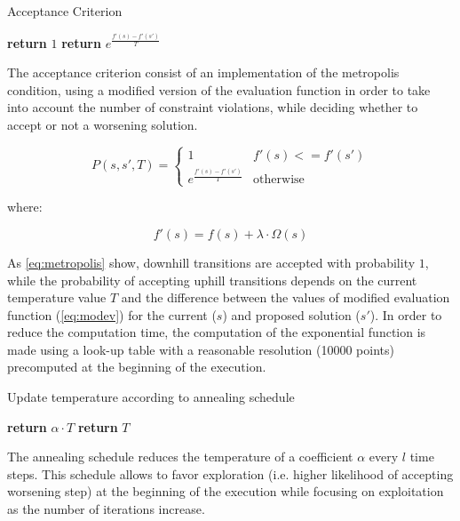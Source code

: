 \begin{homeworkProblem}
\begin{algorithm}
\caption{Acceptance Criterion}
\label{saTSPTW}
\begin{algorithmic}
  \State \textbf{return} $1$
\Else
  \State \textbf{return} $e^{\frac{f'(s)-f'(s')}{T}}$
\EndIf
\EndProcedure
\end{algorithmic}
\end{algorithm}

The acceptance criterion consist of an implementation of the metropolis condition, using a modified version of the evaluation function in order to take into account the number of constraint violations, while deciding whether to accept or not a worsening solution.

\begin{equation} \label{eq:metropolis}
  P(s,s',T) = \begin{cases}
               1 & f'(s) <= f'(s') \\
               e^{\frac{f'(s)-f'(s')}{T}} & \text{otherwise}
              \end{cases}
\end{equation}

where:

\begin{equation} \label{eq:modev}
  f'(s) = f(s) + \lambda \cdot \Omega(s)
\end{equation}

As \ref{eq:metropolis} show, downhill transitions are accepted with probability $1$, while the probability of accepting uphill transitions depends on the current temperature value $T$ and the difference between the values of modified evaluation function (\ref{eq:modev}) for the current ($s$) and proposed solution ($s'$).
In order to reduce the computation time, the computation of the exponential function is made using a look-up table with a reasonable resolution (10000 points) precomputed at the beginning of the execution.


\begin{algorithm}
\caption{Update temperature according to annealing schedule}
\label{saTSPTW}
\begin{algorithmic}
    \State \textbf{return} $\alpha \cdot T$
  \Else
    \State \textbf{return} $T$
  \EndIf
\EndProcedure
\end{algorithmic}
\end{algorithm}

The annealing schedule reduces the temperature of a coefficient $\alpha$ every $l$ time steps. 
This schedule allows to favor exploration (i.e. higher likelihood of accepting worsening step) at the beginning of the execution while focusing on exploitation as the number of iterations increase.


\end{homeworkProblem}
